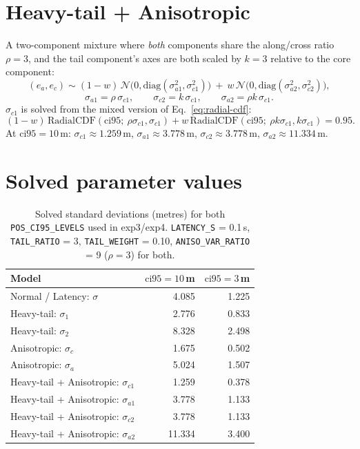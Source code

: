 \documentclass[11pt]{article}
\newcommand{\ci}{\mathrm{ci95}}
\begin{document}
\section{Heavy-tail + Anisotropic}
A two-component mixture where \emph{both} components share the along/cross
ratio $\rho = 3$, and the tail component's axes are both scaled by
$k = 3$ relative to the core component:
\begin{equation}
  (e_a, e_c) \sim (1-w)\,\mathcal{N}\big(0, \mathrm{diag}(\sigma_{a1}^2, \sigma_{c1}^2)\big)
             \ +\ w\,\mathcal{N}\big(0, \mathrm{diag}(\sigma_{a2}^2, \sigma_{c2}^2)\big),
\end{equation}
\begin{equation}
  \sigma_{a1} = \rho\,\sigma_{c1}, \qquad
  \sigma_{c2} = k\,\sigma_{c1}, \qquad
  \sigma_{a2} = \rho k\,\sigma_{c1}.
\end{equation}
$\sigma_{c1}$ is solved from the mixed version of Eq.~\eqref{eq:radial-cdf}:
\begin{equation}
  (1-w)\,\mathrm{RadialCDF}(\ci;\ \rho\sigma_{c1}, \sigma_{c1})
  + w\,\mathrm{RadialCDF}(\ci;\ \rho k \sigma_{c1}, k\sigma_{c1}) = 0.95.
\end{equation}
At $\ci = 10$\,m: $\sigma_{c1} \approx 1.259$\,m, $\sigma_{a1} \approx 3.778$\,m,
$\sigma_{c2} \approx 3.778$\,m, $\sigma_{a2} \approx 11.334$\,m.

\section*{Solved parameter values}
\begin{table}[h!]
  \centering
  \begin{tabular}{lrr}
    \toprule
    \textbf{Model} & $\ci = 10$\,m & $\ci = 3$\,m \\
    \midrule
    Normal / Latency: $\sigma$                  & 4.085  & 1.225 \\
    Heavy-tail: $\sigma_1$                       & 2.776  & 0.833 \\
    Heavy-tail: $\sigma_2$                       & 8.328  & 2.498 \\
    Anisotropic: $\sigma_c$                      & 1.675  & 0.502 \\
    Anisotropic: $\sigma_a$                      & 5.024  & 1.507 \\
    Heavy-tail + Anisotropic: $\sigma_{c1}$       & 1.259  & 0.378 \\
    Heavy-tail + Anisotropic: $\sigma_{a1}$       & 3.778  & 1.133 \\
    Heavy-tail + Anisotropic: $\sigma_{c2}$       & 3.778  & 1.133 \\
    Heavy-tail + Anisotropic: $\sigma_{a2}$       & 11.334 & 3.400 \\
    \bottomrule
  \end{tabular}
  \caption{Solved standard deviations (metres) for both \texttt{POS\_CI95\_LEVELS}
  used in exp3/exp4. \texttt{LATENCY\_S} = 0.1\,s, \texttt{TAIL\_RATIO} = 3,
  \texttt{TAIL\_WEIGHT} = 0.10, \texttt{ANISO\_VAR\_RATIO} = 9 ($\rho = 3$)
  for both.}
\end{table}
\end{document}
